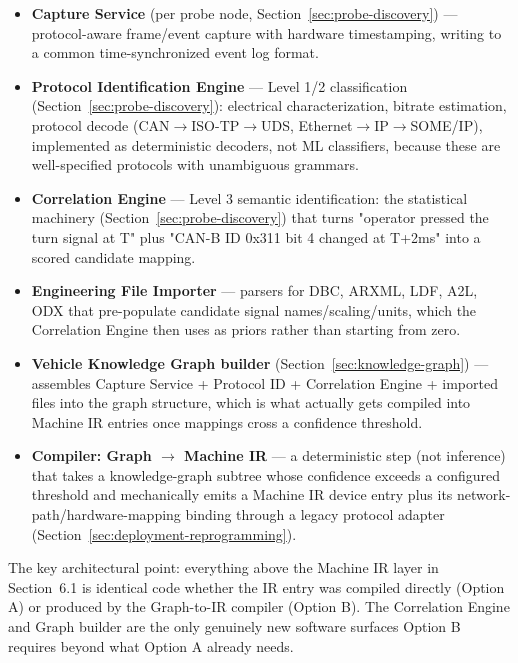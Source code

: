\begin{itemize}
\item \textbf{Capture Service} (per probe node, Section~\ref{sec:probe-discovery}) --- protocol-aware frame/event capture with hardware timestamping, writing to a common time-synchronized event log format.
\item \textbf{Protocol Identification Engine} --- Level 1/2 classification (Section~\ref{sec:probe-discovery}): electrical characterization, bitrate estimation, protocol decode (CAN$\rightarrow$ISO-TP$\rightarrow$UDS, Ethernet$\rightarrow$IP$\rightarrow$SOME/IP), implemented as deterministic decoders, not ML classifiers, because these are well-specified protocols with unambiguous grammars.
\item \textbf{Correlation Engine} --- Level 3 semantic identification: the statistical machinery (Section~\ref{sec:probe-discovery}) that turns "operator pressed the turn signal at T" plus "CAN-B ID 0x311 bit 4 changed at T+2ms" into a scored candidate mapping.
\item \textbf{Engineering File Importer} --- parsers for DBC, ARXML, LDF, A2L, ODX that pre-populate candidate signal names/scaling/units, which the Correlation Engine then uses as priors rather than starting from zero.
\item \textbf{Vehicle Knowledge Graph builder} (Section~\ref{sec:knowledge-graph}) --- assembles Capture Service + Protocol ID + Correlation Engine + imported files into the graph structure, which is what actually gets compiled into Machine IR entries once mappings cross a confidence threshold.
\item \textbf{Compiler: Graph $\rightarrow$ Machine IR} --- a deterministic step (not inference) that takes a knowledge-graph subtree whose confidence exceeds a configured threshold and mechanically emits a Machine IR device entry plus its network-path/hardware-mapping binding through a legacy protocol adapter (Section~\ref{sec:deployment-reprogramming}).
\end{itemize}

The key architectural point: everything above the Machine IR layer in Section~6.1 is identical code whether the IR entry was compiled directly (Option A) or produced by the Graph-to-IR compiler (Option B). The Correlation Engine and Graph builder are the only genuinely new software surfaces Option B requires beyond what Option A already needs.
